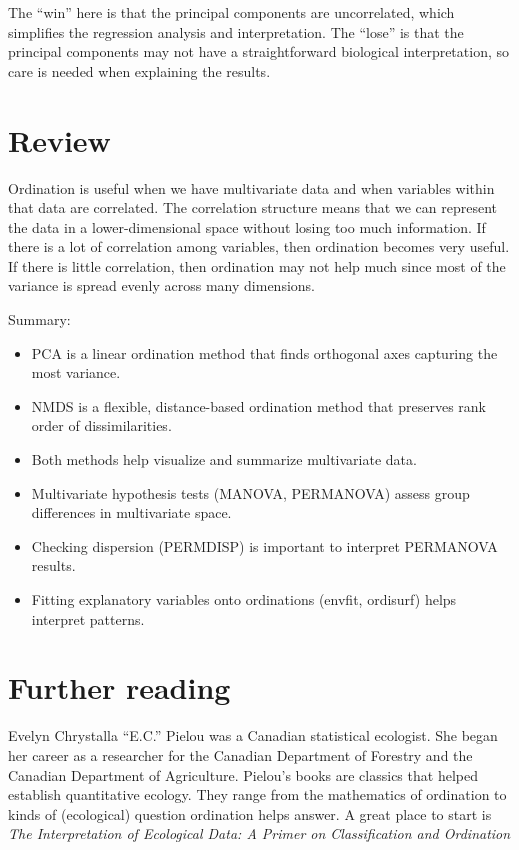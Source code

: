 \documentclass[
  letterpaper,
  8pt,
  a4paper]{book}
\providecommand{\tightlist}{%
  \setlength{\itemsep}{0pt}\setlength{\parskip}{0pt}}
\begin{document}
The ``win'' here is that the principal components are uncorrelated,
which simplifies the regression analysis and interpretation. The
``lose'' is that the principal components may not have a straightforward
biological interpretation, so care is needed when explaining the
results.

\section*{Review}\label{review-8}


Ordination is useful when we have multivariate data and when variables
within that data are correlated. The correlation structure means that we
can represent the data in a lower-dimensional space without losing too
much information. If there is a lot of correlation among variables, then
ordination becomes very useful. If there is little correlation, then
ordination may not help much since most of the variance is spread evenly
across many dimensions.

Summary:

\begin{itemize}
\tightlist
\item
  PCA is a linear ordination method that finds orthogonal axes capturing
  the most variance.
\item
  NMDS is a flexible, distance-based ordination method that preserves
  rank order of dissimilarities.
\item
  Both methods help visualize and summarize multivariate data.
\item
  Multivariate hypothesis tests (MANOVA, PERMANOVA) assess group
  differences in multivariate space.
\item
  Checking dispersion (PERMDISP) is important to interpret PERMANOVA
  results.
\item
  Fitting explanatory variables onto ordinations (envfit, ordisurf)
  helps interpret patterns.
\end{itemize}

\section*{Further reading}\label{further-reading-8}


Evelyn Chrystalla ``E.C.'' Pielou was a Canadian statistical ecologist.
She began her career as a researcher for the Canadian Department of
Forestry and the Canadian Department of Agriculture. Pielou's books are
classics that helped establish quantitative ecology. They range from the
mathematics of ordination to kinds of (ecological) question ordination
helps answer. A great place to start is \emph{The Interpretation of
Ecological Data: A Primer on Classification and Ordination}
\end{document}
